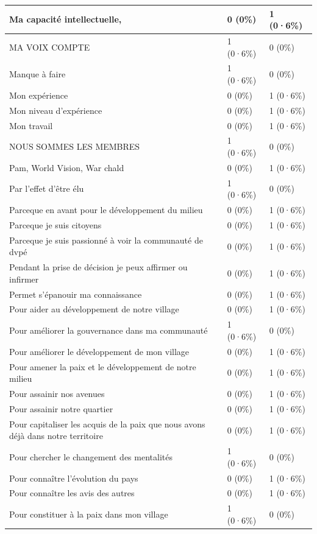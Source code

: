 \documentclass[
]{book}
\begin{document}
\begin{tabular}{l|l|l}
\hline
Ma capacité intellectuelle, & 0 (0\%) & 1 (0·6\%)\\
\hline
MA VOIX COMPTE & 1 (0·6\%) & 0 (0\%)\\
\hline
Manque à faire & 1 (0·6\%) & 0 (0\%)\\
\hline
Mon expérience & 0 (0\%) & 1 (0·6\%)\\
\hline
Mon niveau d'expérience & 0 (0\%) & 1 (0·6\%)\\
\hline
Mon travail & 0 (0\%) & 1 (0·6\%)\\
\hline
NOUS SOMMES LES MEMBRES & 1 (0·6\%) & 0 (0\%)\\
\hline
Pam, World Vision, War chald & 0 (0\%) & 1 (0·6\%)\\
\hline
Par l'effet d'être élu & 1 (0·6\%) & 0 (0\%)\\
\hline
Parceque en avant pour le développement du milieu & 0 (0\%) & 1 (0·6\%)\\
\hline
Parceque je suis citoyens & 0 (0\%) & 1 (0·6\%)\\
\hline
Parceque je suis passionné à voir la communauté de dvpé & 0 (0\%) & 1 (0·6\%)\\
\hline
Pendant la prise de décision je peux affirmer ou infirmer & 0 (0\%) & 1 (0·6\%)\\
\hline
Permet s'épanouir ma connaissance & 0 (0\%) & 1 (0·6\%)\\
\hline
Pour aider au développement de notre village & 0 (0\%) & 1 (0·6\%)\\
\hline
Pour améliorer la gouvernance dans ma communauté & 1 (0·6\%) & 0 (0\%)\\
\hline
Pour améliorer le développement de mon village & 0 (0\%) & 1 (0·6\%)\\
\hline
Pour amener la paix et le développement de notre milieu & 0 (0\%) & 1 (0·6\%)\\
\hline
Pour assainir nos avenues & 0 (0\%) & 1 (0·6\%)\\
\hline
Pour assainir notre quartier & 0 (0\%) & 1 (0·6\%)\\
\hline
Pour capitaliser les acquis de la  paix que nous avons déjà dans notre territoire & 0 (0\%) & 1 (0·6\%)\\
\hline
Pour chercher le changement des mentalités & 1 (0·6\%) & 0 (0\%)\\
\hline
Pour connaître l'évolution du pays & 0 (0\%) & 1 (0·6\%)\\
\hline
Pour connaître les avis des autres & 0 (0\%) & 1 (0·6\%)\\
\hline
Pour constituer à la paix dans mon village & 1 (0·6\%) & 0 (0\%)\\

\end{tabular}
\end{document}
